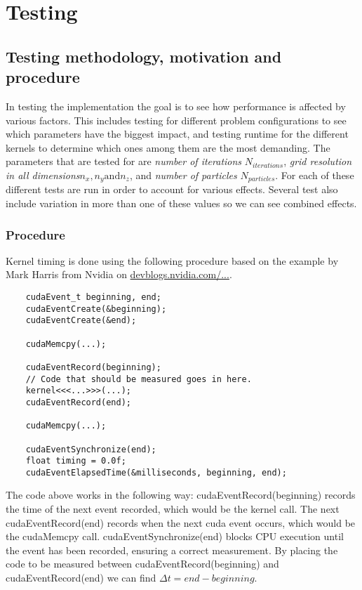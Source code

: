 \chapter{Testing}

\section{Testing methodology, motivation and procedure}
In testing the implementation the goal is to see how performance is affected by various factors. This includes testing
for different problem configurations to see which parameters have the biggest impact, and testing runtime for the
different kernels to determine which ones among them are the most demanding.
The parameters that are tested for are \emph{number of iterations} $N_{iterations}$, \emph{grid resolution in all
dimensions}$n_x, n_y \text{and} n_z$, and \emph{number of particles} $N_{particles}$. For each of these different tests
are run in order to account for various effects. Several test also include variation in more than one
of these values so we can see combined effects.
\subsection{Procedure}
\label{sec:cuda-measure}
Kernel timing is done using the following procedure based on the example by Mark Harris from Nvidia on \href{http://devblogs.nvidia.com/parallelforall/how-implement-performance-metrics-cuda-cc/}{devblogs.nvidia.com/...}.
\begin{lstlisting}
	cudaEvent_t beginning, end;
	cudaEventCreate(&beginning);
	cudaEventCreate(&end);
	
	cudaMemcpy(...);
	
	cudaEventRecord(beginning);
	// Code that should be measured goes in here.
	kernel<<<...>>>(...);
	cudaEventRecord(end);
	
	cudaMemcpy(...);
	
	cudaEventSynchronize(end);
	float timing = 0.0f;
	cudaEventElapsedTime(&milliseconds, beginning, end);
\end{lstlisting}
The code above works in the following way: cudaEventRecord(beginning) records the time of the next event recorded, which
would be the kernel call. The next cudaEventRecord(end) records when the next cuda event occurs, which would be the
cudaMemcpy call. cudaEventSynchronize(end) blocks CPU execution until the event has been recorded, ensuring a correct
measurement. By placing the code to be measured between cudaEventRecord(beginning) and cudaEventRecord(end) we can find
$\Delta t = end - beginning$.

